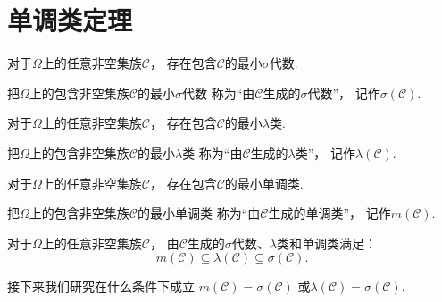 \section{单调类定理}
\begin{proposition}
对于\(\Omega\)上的任意非空集族\(\mathcal{C}\)，
存在包含\(\mathcal{C}\)的最小\(\sigma\)代数.
\end{proposition}
\begin{definition}
把\(\Omega\)上的包含非空集族\(\mathcal{C}\)的最小\(\sigma\)代数
称为“由\(\mathcal{C}\)生成的\(\sigma\)代数”，
记作\(\sigma(\mathcal{C})\).
\end{definition}

\begin{proposition}
对于\(\Omega\)上的任意非空集族\(\mathcal{C}\)，
存在包含\(\mathcal{C}\)的最小\(\lambda\)类.
\end{proposition}
\begin{definition}
把\(\Omega\)上的包含非空集族\(\mathcal{C}\)的最小\(\lambda\)类
称为“由\(\mathcal{C}\)生成的\(\lambda\)类”，
记作\(\lambda(\mathcal{C})\).
\end{definition}

\begin{proposition}
对于\(\Omega\)上的任意非空集族\(\mathcal{C}\)，
存在包含\(\mathcal{C}\)的最小单调类.
\end{proposition}
\begin{definition}
把\(\Omega\)上的包含非空集族\(\mathcal{C}\)的最小单调类
称为“由\(\mathcal{C}\)生成的单调类”，
记作\(m(\mathcal{C})\).
\end{definition}

\begin{proposition}
对于\(\Omega\)上的任意非空集族\(\mathcal{C}\)，
由\(\mathcal{C}\)生成的\(\sigma\)代数、\(\lambda\)类和单调类满足：\begin{equation*}
	m(\mathcal{C})
	\subseteq \lambda(\mathcal{C})
	\subseteq \sigma(\mathcal{C}).
\end{equation*}
\end{proposition}

接下来我们研究在什么条件下成立
\(m(\mathcal{C}) = \sigma(\mathcal{C})\)
或\(\lambda(\mathcal{C}) = \sigma(\mathcal{C})\).
